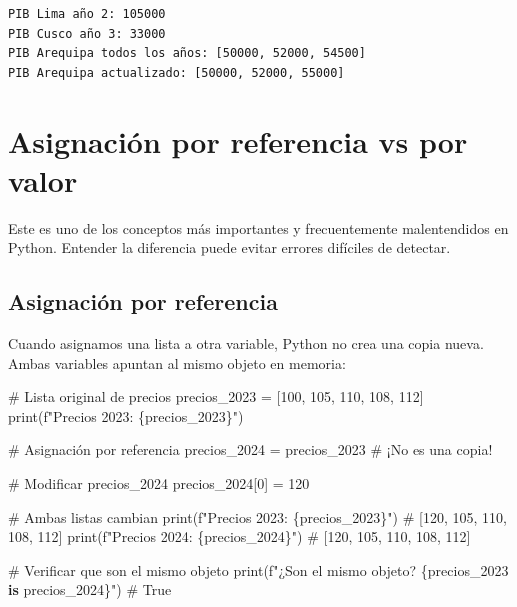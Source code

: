 \documentclass[
  doc,
  floatsintext,
  longtable,
  a4paper,
  nolmodern,
  notxfonts,
  notimes,
  12pt,
  colorlinks=true,linkcolor=blue,citecolor=blue,urlcolor=blue]{apa7}
\newenvironment{Shaded}{\begin{snugshade}}{\end{snugshade}}
\newcommand{\BuiltInTok}[1]{\textcolor[rgb]{0.00,0.23,0.31}{#1}}
\newcommand{\CommentTok}[1]{\textcolor[rgb]{0.37,0.37,0.37}{#1}}
\newcommand{\DecValTok}[1]{\textcolor[rgb]{0.68,0.00,0.00}{#1}}
\newcommand{\KeywordTok}[1]{\textcolor[rgb]{0.00,0.23,0.31}{\textbf{#1}}}
\newcommand{\NormalTok}[1]{\textcolor[rgb]{0.00,0.23,0.31}{#1}}
\newcommand{\OperatorTok}[1]{\textcolor[rgb]{0.37,0.37,0.37}{#1}}
\newcommand{\SpecialCharTok}[1]{\textcolor[rgb]{0.37,0.37,0.37}{#1}}
\newcommand{\SpecialStringTok}[1]{\textcolor[rgb]{0.13,0.47,0.30}{#1}}
\begin{document}
\begin{verbatim}
PIB Lima año 2: 105000
PIB Cusco año 3: 33000
PIB Arequipa todos los años: [50000, 52000, 54500]
PIB Arequipa actualizado: [50000, 52000, 55000]
\end{verbatim}

\section{Asignación por referencia vs por
valor}\label{asignaciuxf3n-por-referencia-vs-por-valor}

Este es uno de los conceptos más importantes y frecuentemente
malentendidos en Python. Entender la diferencia puede evitar errores
difíciles de detectar.

\subsection{Asignación por
referencia}\label{asignaciuxf3n-por-referencia}

Cuando asignamos una lista a otra variable, Python no crea una copia
nueva. Ambas variables apuntan al mismo objeto en memoria:

\begin{Shaded}
\begin{Highlighting}[]
\CommentTok{\# Lista original de precios}
\NormalTok{precios\_2023 }\OperatorTok{=}\NormalTok{ [}\DecValTok{100}\NormalTok{, }\DecValTok{105}\NormalTok{, }\DecValTok{110}\NormalTok{, }\DecValTok{108}\NormalTok{, }\DecValTok{112}\NormalTok{]}
\BuiltInTok{print}\NormalTok{(}\SpecialStringTok{f"Precios 2023: }\SpecialCharTok{\{}\NormalTok{precios\_2023}\SpecialCharTok{\}}\SpecialStringTok{"}\NormalTok{)}

\CommentTok{\# Asignación por referencia}
\NormalTok{precios\_2024 }\OperatorTok{=}\NormalTok{ precios\_2023  }\CommentTok{\# ¡No es una copia!}

\CommentTok{\# Modificar precios\_2024}
\NormalTok{precios\_2024[}\DecValTok{0}\NormalTok{] }\OperatorTok{=} \DecValTok{120}

\CommentTok{\# Ambas listas cambian}
\BuiltInTok{print}\NormalTok{(}\SpecialStringTok{f"Precios 2023: }\SpecialCharTok{\{}\NormalTok{precios\_2023}\SpecialCharTok{\}}\SpecialStringTok{"}\NormalTok{)  }\CommentTok{\# [120, 105, 110, 108, 112]}
\BuiltInTok{print}\NormalTok{(}\SpecialStringTok{f"Precios 2024: }\SpecialCharTok{\{}\NormalTok{precios\_2024}\SpecialCharTok{\}}\SpecialStringTok{"}\NormalTok{)  }\CommentTok{\# [120, 105, 110, 108, 112]}

\CommentTok{\# Verificar que son el mismo objeto}
\BuiltInTok{print}\NormalTok{(}\SpecialStringTok{f"¿Son el mismo objeto? }\SpecialCharTok{\{}\NormalTok{precios\_2023 }\KeywordTok{is}\NormalTok{ precios\_2024}\SpecialCharTok{\}}\SpecialStringTok{"}\NormalTok{)  }\CommentTok{\# True}
\end{Highlighting}
\end{Shaded}
\end{document}
